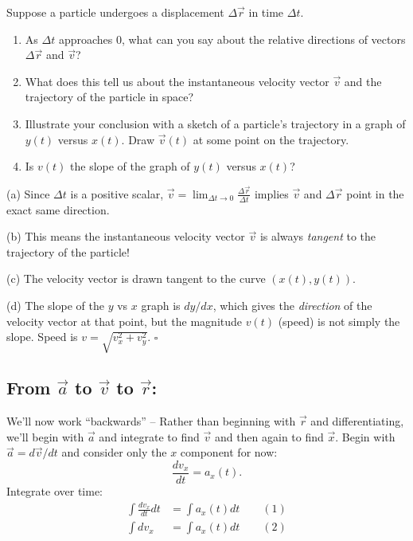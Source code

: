 \documentclass[11pt, letterpaper, openany]{book}
\newenvironment{exercise}[1][Exercise]{%
  \tcolorbox[blanker, breakable, left=1em,
    before skip=1em, after skip=1em,
    borderline west={3pt}{0pt}{PhysNavy},
    colback=PhysCream,
    before upper={\textcolor{PhysNavy}{\sffamily\bfseries #1:}\space}
  ]%
}{%
  \endtcolorbox%
}
\newenvironment{solution}[1][Solution]{%
  \tcolorbox[blanker, breakable, left=1em,
    before skip=1em, after skip=1em,
    borderline west={2pt}{0pt}{PhysTeal},
    colback=PhysCream,
    before upper={\textcolor{PhysTeal}{\sffamily\bfseries #1.}\space}
  ]%
}{%
  \hfill\textcolor{PhysTeal}{\ensuremath{\square}}\endtcolorbox%
}
\begin{document}
\begin{exercise}[Exercise 7]
Suppose a particle undergoes a displacement $\Delta\vec{r}$ in time $\Delta t$.
\begin{enumerate}[label=(\alph*)]
    \item As $\Delta t$ approaches 0, what can you say about the relative directions of vectors $\Delta\vec{r}$ and $\vec{v}$?
    \item What does this tell us about the instantaneous velocity vector $\vec{v}$ and the trajectory of the particle in space?
    \item Illustrate your conclusion with a sketch of a particle's trajectory in a graph of $y(t)$ versus $x(t)$. Draw $\vec{v}(t)$ at some point on the trajectory.
    \item Is $v(t)$ the slope of the graph of $y(t)$ versus $x(t)$?
\end{enumerate}
\end{exercise}
\begin{solution}
(a) Since $\Delta t$ is a positive scalar, $\vec{v} = \lim_{\Delta t \to 0} \frac{\Delta \vec{r}}{\Delta t}$ implies $\vec{v}$ and $\Delta \vec{r}$ point in the exact same direction.

(b) This means the instantaneous velocity vector $\vec{v}$ is always \textit{tangent} to the trajectory of the particle!

(c) The velocity vector is drawn tangent to the curve $(x(t), y(t))$.

(d) The slope of the $y$ vs $x$ graph is $dy/dx$, which gives the \textit{direction} of the velocity vector at that point, but the magnitude $v(t)$ (speed) is not simply the slope. Speed is $v = \sqrt{v_x^2 + v_y^2}$.
\end{solution}

\subsection{From $\vec{a}$ to $\vec{v}$ to $\vec{r}$:}

We'll now work ``backwards'' -- Rather than beginning with $\vec{r}$ and differentiating, we'll begin with $\vec{a}$ and integrate to find $\vec{v}$ and then again to find $\vec{x}$.
Begin with $\vec{a} = d\vec{v}/dt$ and consider only the $x$ component for now:
\[ \frac{dv_x}{dt} = a_x(t). \]
Integrate over time:
\begin{align}
    \int \frac{dv_x}{dt} dt &= \int a_x(t) dt \qquad (1) \\
    \int dv_x &= \int a_x(t) dt \qquad (2)
\end{align}
\end{document}
